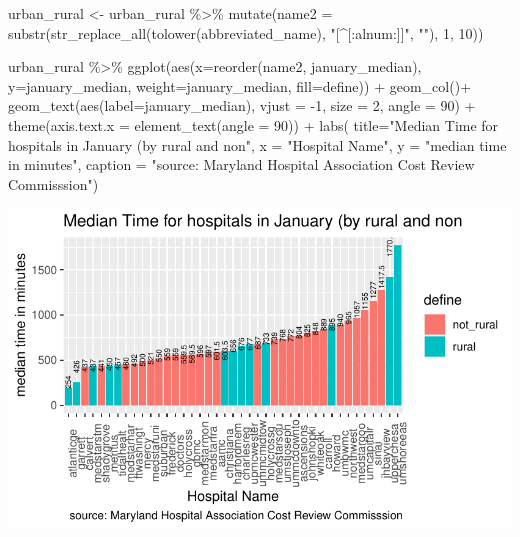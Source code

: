 \documentclass[
  letterpaper,
  DIV=11,
  numbers=noendperiod]{scrartcl}
\newenvironment{Shaded}{\begin{snugshade}}{\end{snugshade}}
\newcommand{\AttributeTok}[1]{\textcolor[rgb]{0.40,0.45,0.13}{#1}}
\newcommand{\DecValTok}[1]{\textcolor[rgb]{0.68,0.00,0.00}{#1}}
\newcommand{\FunctionTok}[1]{\textcolor[rgb]{0.28,0.35,0.67}{#1}}
\newcommand{\NormalTok}[1]{\textcolor[rgb]{0.00,0.23,0.31}{#1}}
\newcommand{\OtherTok}[1]{\textcolor[rgb]{0.00,0.23,0.31}{#1}}
\newcommand{\SpecialCharTok}[1]{\textcolor[rgb]{0.37,0.37,0.37}{#1}}
\newcommand{\StringTok}[1]{\textcolor[rgb]{0.13,0.47,0.30}{#1}}
\begin{document}
\begin{Shaded}
\begin{Highlighting}[]
\NormalTok{urban\_rural }\OtherTok{\textless{}{-}}\NormalTok{ urban\_rural }\SpecialCharTok{\%\textgreater{}\%}
  \FunctionTok{mutate}\NormalTok{(}\AttributeTok{name2 =} \FunctionTok{substr}\NormalTok{(}\FunctionTok{str\_replace\_all}\NormalTok{(}\FunctionTok{tolower}\NormalTok{(abbreviated\_name), }\StringTok{"[\^{}[:alnum:]]"}\NormalTok{, }\StringTok{""}\NormalTok{), }\DecValTok{1}\NormalTok{, }\DecValTok{10}\NormalTok{))}

\NormalTok{urban\_rural }\SpecialCharTok{\%\textgreater{}\%} 
  \FunctionTok{ggplot}\NormalTok{(}\FunctionTok{aes}\NormalTok{(}\AttributeTok{x=}\FunctionTok{reorder}\NormalTok{(name2, january\_median), }\AttributeTok{y=}\NormalTok{january\_median, }\AttributeTok{weight=}\NormalTok{january\_median, }\AttributeTok{fill=}\NormalTok{define)) }\SpecialCharTok{+}
  \FunctionTok{geom\_col}\NormalTok{()}\SpecialCharTok{+}
  \FunctionTok{geom\_text}\NormalTok{(}\FunctionTok{aes}\NormalTok{(}\AttributeTok{label=}\NormalTok{january\_median), }\AttributeTok{vjust =} \SpecialCharTok{{-}}\DecValTok{1}\NormalTok{, }\AttributeTok{size =} \DecValTok{2}\NormalTok{, }\AttributeTok{angle =} \DecValTok{90}\NormalTok{) }\SpecialCharTok{+}
  \FunctionTok{theme}\NormalTok{(}\AttributeTok{axis.text.x =} \FunctionTok{element\_text}\NormalTok{(}\AttributeTok{angle =} \DecValTok{90}\NormalTok{)) }\SpecialCharTok{+}
  \FunctionTok{labs}\NormalTok{(}
    \AttributeTok{title=}\StringTok{"Median Time for hospitals in January (by rural and non"}\NormalTok{,}
    \AttributeTok{x =} \StringTok{"Hospital Name"}\NormalTok{,}
    \AttributeTok{y =} \StringTok{"median time in minutes"}\NormalTok{,}
    \AttributeTok{caption =} \StringTok{"source: Maryland Hospital Association Cost Review Commisssion"}\NormalTok{)}
\end{Highlighting}
\end{Shaded}

\includegraphics{Condon_MD_HOSPITAL_DATA_FINAL_files/figure-pdf/unnamed-chunk-14-1.pdf}
\end{document}
